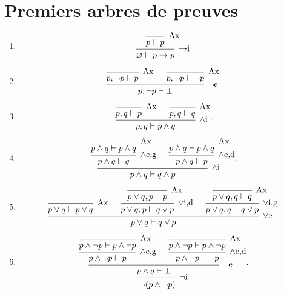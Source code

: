 \section{Premiers arbres de preuves}

\begin{enumerate}
	\item \[
			\begin{prooftree}
				\infer 0[Ax]{p \vdash p}
				\infer 1[$\to$i]{\O \vdash p \to p} %
			\end{prooftree}
		.\]
	\item \[
			\begin{prooftree}
				\infer 0[Ax]{p,\lnot p \vdash p}
				\infer 0[Ax]{p,\lnot p \vdash \lnot p}
				\infer 2[$\lnot$e]{p,\lnot p \vdash \bot} %
			\end{prooftree}
		.\] 
	\item \[
			\begin{prooftree}
				\infer 0[Ax]{p,q \vdash p}
				\infer 0[Ax]{p,q \vdash q}
				\infer 2[$\land$i]{p,q\vdash p \land q}
			\end{prooftree}
		.\]
	\item \[
			\begin{prooftree}
				\infer 0[Ax]{p \land q \vdash p \land q}
				\infer 1[$\land$e,g]{p \land q \vdash q} %
				\infer 0[Ax]{p \land q \vdash p \land q}
				\infer 1[$\land$e,d]{p \land q \vdash p} %
				\infer 2[$\land$i]{p \land q \vdash q \land p}
			\end{prooftree}
		.\]
	\item \[
			\begin{prooftree}
				\infer 0[Ax]{p \lor q \vdash p \lor q}
				\infer 0[Ax]{p \lor q, p \vdash p}
				\infer 1[$\lor$i,d]{p \lor q,p \vdash q \lor p}
				\infer 0[Ax]{p \lor q, q \vdash q}
				\infer 1[$\lor$i,g]{p \lor q,q \vdash q \lor p}
				\infer 3[$\lor$e]{p \lor q \vdash q \lor p} %
			\end{prooftree}
		.\]
	\item \[
			\begin{prooftree}
				\infer 0[Ax]{p \land \lnot p \vdash p \land \lnot p}
				\infer 1[$\land$e,g]{p \land \lnot p \vdash p} %
				\infer 0[Ax]{p \land \lnot p \vdash p \land \lnot p}
				\infer 1[$\land$e,d]{p \land \lnot p \vdash \lnot p} %
				\infer 2[$\lnot$e]{p \land q \vdash \bot} %
				\infer 1[$\lnot$i]{\vdash \lnot (p \land \lnot p)} %
			\end{prooftree}
		.\]
\end{enumerate}

